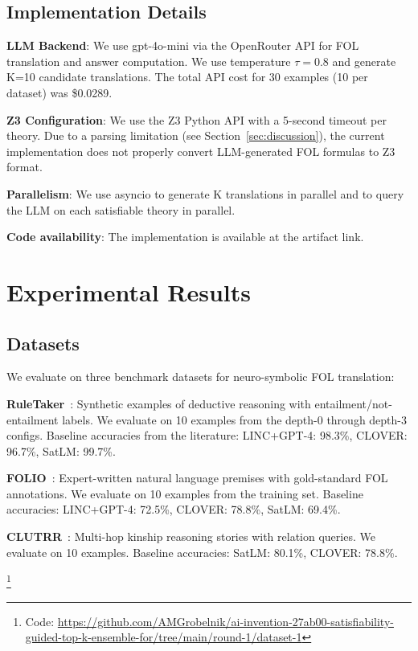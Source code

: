 \documentclass[11pt,letterpaper]{article}
\begin{document}
\subsection{Implementation Details}

\textbf{LLM Backend}: We use gpt-4o-mini via the OpenRouter API for FOL translation and answer computation. We use temperature $\tau=0.8$ and generate K=10 candidate translations. The total API cost for 30 examples (10 per dataset) was \$0.0289.

\textbf{Z3 Configuration}: We use the Z3 Python API with a 5-second timeout per theory. Due to a parsing limitation (see Section~\ref{sec:discussion}), the current implementation does not properly convert LLM-generated FOL formulas to Z3 format.

\textbf{Parallelism}: We use asyncio to generate K translations in parallel and to query the LLM on each satisfiable theory in parallel.

\textbf{Code availability}: The implementation is available at the artifact link.

\section{Experimental Results}
\label{sec:experiments}

\subsection{Datasets}

We evaluate on three benchmark datasets for neuro-symbolic FOL translation:

\textbf{RuleTaker}~\cite{Clark2021}: Synthetic examples of deductive reasoning with entailment/not-entailment labels. We evaluate on 10 examples from the depth-0 through depth-3 configs. Baseline accuracies from the literature: LINC+GPT-4: 98.3\%, CLOVER: 96.7\%, SatLM: 99.7\%.

\textbf{FOLIO}~\cite{Han2022}: Expert-written natural language premises with gold-standard FOL annotations. We evaluate on 10 examples from the training set. Baseline accuracies: LINC+GPT-4: 72.5\%, CLOVER: 78.8\%, SatLM: 69.4\%.

\textbf{CLUTRR}~\cite{Sinha2019}: Multi-hop kinship reasoning stories with relation queries. We evaluate on 10 examples. Baseline accuracies: SatLM: 80.1\%, CLOVER: 78.8\%.

\footnote{Code: \url{https://github.com/AMGrobelnik/ai-invention-27ab00-satisfiability-guided-top-k-ensemble-for/tree/main/round-1/dataset-1}}
\end{document}
